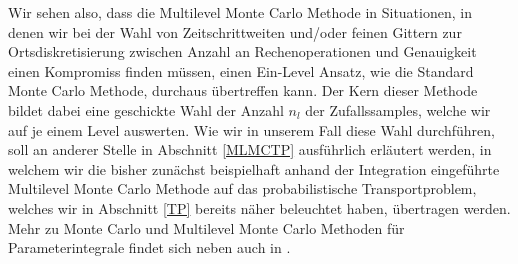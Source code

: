 Wir sehen also, dass die Multilevel Monte Carlo Methode in Situationen, in denen wir bei der Wahl von Zeitschrittweiten und/oder feinen Gittern zur Ortsdiskretisierung zwischen Anzahl an Rechenoperationen und Genauigkeit einen Kompromiss finden müssen, einen Ein-Level Ansatz, wie die Standard Monte Carlo Methode, durchaus übertreffen kann.
Der Kern dieser Methode bildet dabei eine geschickte Wahl der Anzahl $ n_l $ der Zufallssamples, welche wir auf je einem Level auswerten. Wie wir in unserem Fall diese Wahl durchführen, soll an anderer Stelle in Abschnitt \ref{MLMCTP} ausführlich erläutert werden, in welchem wir die bisher zunächst beispielhaft anhand der Integration eingeführte Multilevel Monte Carlo Methode auf das probabilistische Transportproblem, welches wir in Abschnitt \ref{TP} bereits näher beleuchtet haben, übertragen werden.
Mehr zu Monte Carlo und Multilevel Monte Carlo Methoden für Parameterintegrale findet sich neben \cite{heinrich2001multilevel} auch in \cite{heinrich1992random}.

